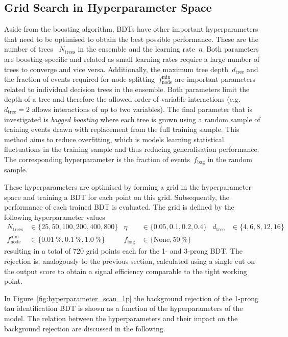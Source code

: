 \subsection{Grid Search in Hyperparameter Space}
\label{sec:bdt_grid_search}

Aside from the boosting algorithm, BDTs have other important hyperparameters
that need to be optimised to obtain the best possible performance. These are the
number of trees~ $N_\text{trees}$ in the ensemble and the learning rate~$\eta$.
Both parameters are boosting-specific and related as small learning rates
require a large number of trees to converge and vice versa. Additionally, the
maximum tree depth~$d_\text{tree}$ and the fraction of events required for node
splitting~$f_\text{node}^\text{min}$ are important parameters related to
individual decision trees in the ensemble. Both parameters limit the depth of a
tree and therefore the allowed order of variable interactions (e.g.\
$d_\text{tree} = 2$ allows interactions of up to two variables). The final
parameter that is investigated is \emph{bagged boosting} where each tree is
grown using a random sample of training events drawn with replacement from the
full training sample. This method aims to reduce overfitting, which is models
learning statistical fluctuations in the training sample and thus reducing
generalisation performance. The corresponding hyperparameter is the fraction of
events~$f_\text{bag}$ in the random sample.

These hyperparameters are optimised by forming a grid in the hyperparameter
space and training a BDT for each point on this grid. Subsequently, the
performance of each trained BDT is evaluated. The grid is defined by the
following hyperparameter values
\begin{align*}
  N_\mathrm{trees} &\in \{25, 50, 100, 200, 400, 800\} & \eta &\in \{0.05, 0.1, 0.2, 0.4\} & d_\mathrm{tree} &\in \{4, 6, 8, 12, 16\}\\
  f_\mathrm{node}^\mathrm{min} &\in \{\SI{0.01}{\percent}, \SI{0.1}{\percent},\SI{1.0}{\percent}\} & f_\text{bag} &\in \{\text{None}, \SI{50}{\percent} \}
\end{align*}
resulting in a total of 720 grid points each for the 1- and 3-prong BDT. The
rejection is, analogously to the previous section, calculated using a single cut
on the output score to obtain a signal efficiency comparable to the tight
working point.

In Figure~\ref{fig:hyperparameter_scan_1p} the background rejection of the
1-prong tau identification BDT is shown as a function of the hyperparameters of
the model. The relation between the hyperparameters and their impact on the
background rejection are discussed in the following.

